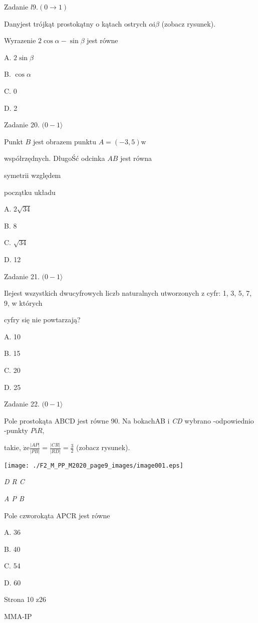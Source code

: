 \documentclass[a4paper,12pt]{article}
\begin{document}
Zadanie $l9. (0\rightarrow 1)$

Danyjest trójkąt prostokątny o kątach ostrych $\alpha \mathrm{i}\beta$ (zobacz rysunek).

Wyrazenie $ 2\cos\alpha-\sin\beta$ jest równe

A. $ 2\sin\beta$

B. $\cos\alpha$

C. 0

D. 2

Zadanie 20. $(0-1\rangle$

Punkt $B$ jest obrazem punktu $A=(-3,5) \mathrm{w}$

współrzędnych. DługoŚć odcinka $AB$ jest równa

symetrii względem

początku układu

A. $2\sqrt{34}$

B. 8

C. $\sqrt{34}$

D. 12

Zadanie 21. $(0-1\rangle$

Ilejest wszystkich dwucyfrowych liczb naturalnych utworzonych z cyfr: 1, 3, 5, 7, 9, w których

cyfry się nie powtarzają?

A. 10

B. 15

C. 20

D. 25

Zadanie 22. $(0-1\rangle$

Pole prostokąta ABCD jest równe 90. Na bokachAB $\mathrm{i}$ {\it CD} wybrano -odpowiednio -punkty {\it P}$\mathrm{i}R,$

takie, $\displaystyle \dot{\mathrm{z}}\mathrm{e}\frac{|AP|}{|PB|}=\frac{|CR|}{|RD|}=\frac{3}{2}$ (zobacz rysunek).
\begin{center}
\texttt{[image: ./F2\_M\_PP\_M2020\_page9\_images/image001.eps]}
\end{center}
{\it D R  C}

{\it A  P B}

Pole czworokąta APCR jest równe

A. 36

B. 40

C. 54

D. 60

Strona 10 z26

MMA-IP
\end{document}

